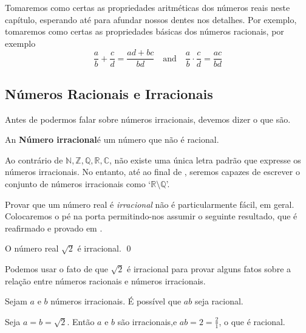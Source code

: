 Tomaremos como certas as propriedades aritméticas dos números reais neste capítulo, esperando até  para afundar nossos dentes nos detalhes. Por exemplo, tomaremos como certas as propriedades básicas dos números racionais, por exemplo
\[ \frac{a}{b}+\frac{c}{d} = \frac{ad+bc}{bd} \quad \text{and} \quad \frac{a}{b} \cdot \frac{c}{d} = \frac{ac}{bd} \]

\subsection*{Números Racionais e Irracionais}
\label{pGettingStartedRationalNumbers}

Antes de podermos falar sobre números irracionais, devemos dizer o que são.

\begin{definition}
\label{defIrrationalNumber}
An \textbf{Número irracional}é um número que não é racional.
\end{definition}

Ao contrário de $\mathbb{N},\mathbb{Z},\mathbb{Q},\mathbb{R},\mathbb{C}$, não existe uma única letra padrão que expresse os números irracionais. No entanto, até ao final de , seremos capazes de escrever o conjunto de números irracionais como `$\mathbb{R} \setminus \mathbb{Q}$'.

Provar que um número real é \textit{irracional} não é particularmente fácil, em geral. Colocaremos o pé na porta permitindo-nos assumir o seguinte resultado, que é reafirmado e provado em .

\begin{proposition}
\label{propSqrt2IrrationalPreliminary}
O número real $\sqrt{2}$ é irracional. \qed
\end{proposition}


Podemos usar o fato de que $\sqrt{2}$ é irracional para provar alguns fatos sobre a relação entre números racionais e números irracionais.

\begin{proposition}
Sejam $a$ e $b$ números irracionais. É possível que $ab$ seja racional.
\end{proposition}

\begin{cproof}
Seja $a=b=\sqrt{2}$. Então $a$ e $b$ são irracionais,e $ab=2=\frac{2}{1}$, o que é racional.
\end{cproof}

